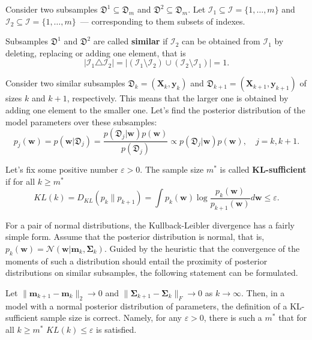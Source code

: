 \documentclass[runningheads]{llncs}
\begin{document}
Consider two subsamples $\mathfrak{D}^1\subseteq\mathfrak{D}_m$ and $\mathfrak{D}^2\subseteq\mathfrak{D}_m$. Let $\mathcal{I}_1 \subseteq \mathcal{I} = \{1, \ldots, m\}$ and $\mathcal{I}_2 \subseteq \mathcal{I} =\{1, \ldots,m\}$~--- corresponding to them subsets of indexes.

\begin{definition}
    Subsamples $\mathfrak{D}^1$ and $\mathfrak{D}^2$ are called \textbf{similar} if $\mathcal{I}_2$ can be obtained from $\mathcal{I}_1$ by deleting, replacing or adding one element, that is
    \[ \left| \mathcal{I}_1 \triangle \mathcal{I}_2 \right| = \left| \left( \mathcal{I}_1 \setminus \mathcal{I}_2 \right) \cup \left( \mathcal{I}_2 \setminus \mathcal{I}_1 \right) \right| = 1. \]
\end{definition}

Consider two similar subsamples $\mathfrak{D}_k = (\mathbf{X}_k,\mathbf{y}_k)$ and $\mathfrak{D}_{k+1} = (\mathbf{X}_{k+1}, \mathbf{y}_{k+1})$ of sizes $k$ and $k+1$, respectively. This means that the larger one is obtained by adding one element to the smaller one. Let's find the posterior distribution of the model parameters over these subsamples:
\[p_j(\mathbf{w}) = p(\mathbf{w} | \mathfrak{D}_j) = \dfrac{p(\mathfrak{D}_j | \mathbf{w}) p(\mathbf{w})}{p(\mathfrak{D}_j)} \propto p(\mathfrak{D}_j | \mathbf{w}) p(\mathbf{w}), \quad j = k, k+1. \]

\begin{definition}
    Let's fix some positive number $\varepsilon > 0$. The sample size $m^*$ is called \textbf{KL-sufficient} if for all $k\geqslant m^*$
    \[ KL(k) = D_{KL}(p_k \| p_{k+1}) = \int p_k(\mathbf{w}) \log{\dfrac{p_k(\mathbf{w})}{p_{k+1}(\mathbf{w})}} d\mathbf{w} \leqslant \varepsilon. \]
\end{definition}

For a pair of normal distributions, the Kullback-Leibler divergence has a fairly simple form. Assume that the posterior distribution is normal, that is, $p_k(\mathbf{w}) = \mathcal{N}\left(\mathbf{w}|\mathbf{m}_k, \mathbf{\Sigma}_k\right)$. Guided by the heuristic that the convergence of the moments of such a distribution should entail the proximity of posterior distributions on similar subsamples, the following statement can be formulated.

\begin{theorem}\label{theorem1}
    Let $\|\mathbf{m}_{k+1} - \mathbf{m}_k\|_2 \to 0$ and $\|\mathbf{\Sigma}_{k+1} - \mathbf{\Sigma}_k\|_{F}\to 0$ as $k\to \infty$. Then, in a model with a normal posterior distribution of parameters, the definition of a KL-sufficient sample size is correct. Namely, for any $\varepsilon > 0$, there is such a $m^*$ that for all $k\geqslant m^*$ $KL(k)\leqslant\varepsilon$ is satisfied.
\end{theorem}
\end{document}
